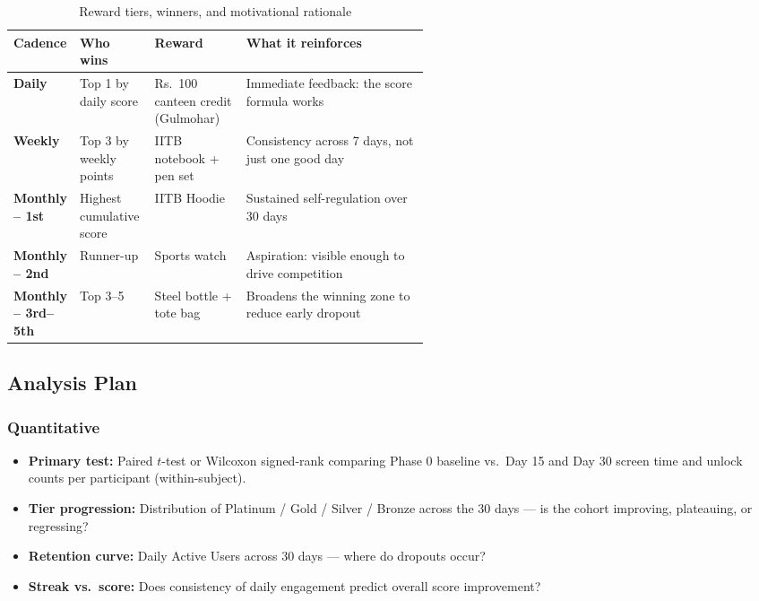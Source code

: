 \documentclass[12pt, a4paper]{article}
\begin{document}
\renewcommand{\arraystretch}{1.5}
\begin{table}[H]
\centering
\caption{Reward tiers, winners, and motivational rationale}
\begin{tabularx}{\linewidth}{>{\bfseries}p{0.14\linewidth} p{0.18\linewidth} p{0.22\linewidth} X}
\toprule
\rowcolor{tablehead}
\color{white}Cadence & \color{white}Who wins & \color{white}Reward & \color{white}What it reinforces \\
\midrule
\color{tealgreen}Daily & Top 1 by daily score & Rs.\ 100 canteen credit (Gulmohar) & Immediate feedback: the score formula works \\
\rowcolor{rowalt}
\color{purplecolor}Weekly & Top 3 by weekly points & IITB notebook + pen set & Consistency across 7 days, not just one good day \\
\color{accentgold}Monthly -- 1st & Highest cumulative score & IITB Hoodie & Sustained self-regulation over 30 days \\
\rowcolor{rowalt}
\color{accentgold}Monthly -- 2nd & Runner-up & Sports watch & Aspiration: visible enough to drive competition \\
\color{accentgold}Monthly -- 3rd--5th & Top 3--5 & Steel bottle + tote bag & Broadens the winning zone to reduce early dropout \\
\bottomrule
\end{tabularx}
\end{table}

\subsection{Analysis Plan}

\subsubsection*{Quantitative}
\begin{itemize}
  \item \textbf{Primary test:} Paired $t$-test or Wilcoxon signed-rank comparing Phase 0 baseline vs.\ Day 15 and Day 30 screen time and unlock counts per participant (within-subject).
  \item \textbf{Tier progression:} Distribution of Platinum / Gold / Silver / Bronze across the 30 days --- is the cohort improving, plateauing, or regressing?
  \item \textbf{Retention curve:} Daily Active Users across 30 days --- where do dropouts occur?
  \item \textbf{Streak vs.\ score:} Does consistency of daily engagement predict overall score improvement?
\end{itemize}
\end{document}
